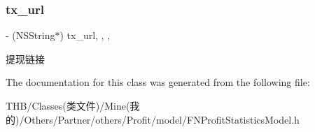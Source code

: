 \subsubsection{\texorpdfstring{tx\+\_\+url}{tx\_url}}
{\footnotesize\ttfamily -\/ (N\+S\+String$\ast$) tx\+\_\+url\hspace{0.3cm}{\ttfamily [read]}, {\ttfamily [write]}, {\ttfamily [nonatomic]}, {\ttfamily [copy]}}

提现链接 

The documentation for this class was generated from the following file\+:\begin{DoxyCompactItemize}
\item 
T\+H\+B/\+Classes(类文件)/\+Mine(我的)/\+Others/\+Partner/others/\+Profit/model/F\+N\+Profit\+Statistics\+Model.\+h\end{DoxyCompactItemize}
